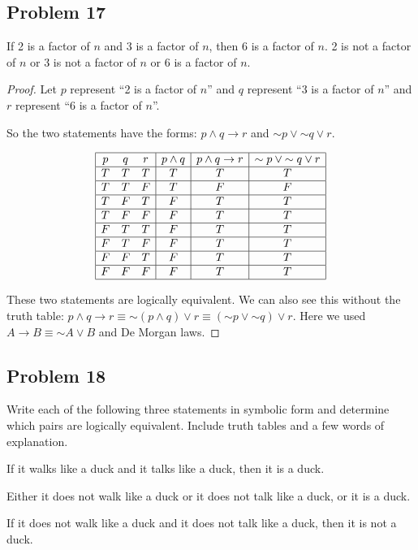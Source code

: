 \documentclass[14pt]{extarticle}
\begin{document}
\subsection{Problem 17}
If 2 is a factor of $n$ and 3 is a factor of $n$, then 6 is a factor of $n$. 2 is not a factor of $n$ or 3 is not a factor of $n$ or 6 is a factor of $n$.

\begin{proof}
Let $p$ represent “2 is a factor of $n$” and $q$ represent “3 is a factor of $n$” and $r$ represent ``6 is a factor of $n$''. 

So the two statements have the forms: $p \wedge q \to r$ and ${\sim p} \vee {\sim q} \vee r$.

$$
\begin{array}{|ccc|c|c|c|}
\hline
p & q & r & p \wedge q & p \wedge q \to r & {\sim p} \vee {\sim q} \vee r \\
\hline
T & T & T & T & T & T \\
\hline
T & T & F & T & F & F \\
\hline
T & F & T & F & T & T \\
\hline
T & F & F & F & T & T \\
\hline
F & T & T & F & T & T \\
\hline
F & T & F & F & T & T \\
\hline
F & F & T & F & T & T \\
\hline
F & F & F & F & T & T \\
\hline
\end{array}
$$

These two statements are logically equivalent. We can also see this without the truth table: $p \wedge q \to r \equiv {\sim (p \wedge q)} \vee r \equiv ({\sim p} \vee {\sim q}) \vee r$. Here we used $A \to B \equiv {\sim A} \vee B$ and De Morgan laws.
\end{proof}

\subsection{Problem 18}
Write each of the following three statements in symbolic form and determine which pairs are logically equivalent. Include truth tables and a few words of explanation.

If it walks like a duck and it talks like a duck, then it is a duck.

Either it does not walk like a duck or it does not talk like a duck, or it is a duck.

If it does not walk like a duck and it does not talk like a duck, then it is not a duck.
\end{document}
